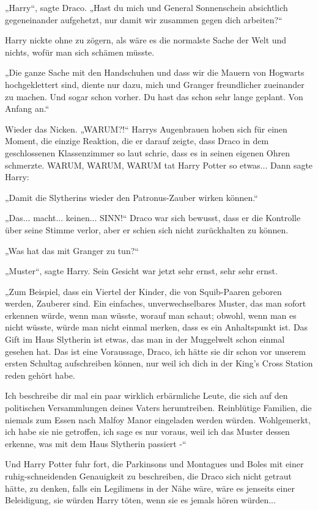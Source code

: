 {„Harry“, sagte Draco. „Hast du mich und General Sonnenschein absichtlich gegeneinander aufgehetzt, nur damit wir zusammen gegen dich arbeiten?“

Harry nickte ohne zu zögern, als wäre es die normalste Sache der Welt und nichts, wofür man sich schämen müsste.

„Die ganze Sache mit den Handschuhen und dass wir die Mauern von Hogwarts hochgeklettert sind, diente nur dazu, mich und Granger freundlicher zueinander zu machen. Und sogar schon vorher. Du hast das schon sehr lange geplant. Von Anfang an.“

Wieder das Nicken. „WARUM?!“ Harrys Augenbrauen hoben sich für einen Moment, die einzige Reaktion, die er darauf zeigte, dass Draco in dem geschlossenen Klassenzimmer so laut schrie, dass es in seinen eigenen Ohren schmerzte. WARUM, WARUM, WARUM tat Harry Potter so etwas... Dann sagte Harry:

„Damit die Slytherins wieder den Patronus-Zauber wirken können.“

„Das... macht... keinen... SINN!“ Draco war sich bewusst, dass er die Kontrolle über seine Stimme verlor, aber er schien sich nicht zurückhalten zu können.

„Was hat das mit Granger zu tun?“

„Muster“, sagte Harry. Sein Gesicht war jetzt sehr ernst, sehr sehr ernst.

„Zum Beispiel, dass ein Viertel der Kinder, die von Squib-Paaren geboren werden, Zauberer sind. Ein einfaches, unverwechselbares Muster, das man sofort erkennen würde, wenn man wüsste, worauf man schaut; obwohl, wenn man es nicht wüsste, würde man nicht einmal merken, dass es ein Anhaltspunkt ist. Das Gift im Haus Slytherin ist etwas, das man in der Muggelwelt schon einmal gesehen hat. Das ist eine Voraussage, Draco, ich hätte sie dir schon vor unserem ersten Schultag aufschreiben können, nur weil ich dich in der King's Cross Station reden gehört habe.

Ich beschreibe dir mal ein paar wirklich erbärmliche Leute, die sich auf den politischen Versammlungen deines Vaters herumtreiben. Reinblütige Familien, die niemals zum Essen nach Malfoy Manor eingeladen werden würden. Wohlgemerkt, ich habe sie nie getroffen, ich sage es nur voraus, weil ich das Muster dessen erkenne, was mit dem Haus Slytherin passiert -“

Und Harry Potter fuhr fort, die Parkinsons und Montagues und Boles mit einer ruhig-schneidenden Genauigkeit zu beschreiben, die Draco sich nicht getraut hätte, zu denken, falls ein Legilimens in der Nähe wäre, wäre es jenseits einer Beleidigung, sie würden Harry töten, wenn sie es jemals hören würden...

}
